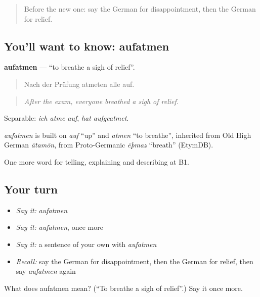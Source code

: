 \begin{quote}
Before the new one: say the German for disappointment, then the German for relief.
\end{quote}

\subsection*{You'll want to know: aufatmen}
\textbf{aufatmen} — \textquotedblleft{}to breathe a sigh of relief\textquotedblright{}.

\begin{quote}
Nach der Prüfung atmeten alle auf.
\end{quote}

\begin{quote}
\emph{After the exam, everyone breathed a sigh of relief.}
\end{quote}

Separable: \emph{ich atme auf}, \emph{hat aufgeatmet}.

\begin{cousinweb}
\emph{aufatmen} is built on \emph{auf} \textquotedblleft{}up\textquotedblright{} and \emph{atmen} \textquotedblleft{}to breathe\textquotedblright{}, inherited from Old High German \emph{ātamōn}, from Proto-Germanic \emph{ēþmaz} \textquotedblleft{}breath\textquotedblright{} (EtymDB).
\end{cousinweb}

\begin{grammarlens}[title={What you've built}]
One more word for telling, explaining and describing at B1.
\end{grammarlens}

\subsection*{Your turn}
\begin{itemize}
\raggedright
  \item \emph{Say it:} \emph{aufatmen}
  \item \emph{Say it:} \emph{aufatmen}, once more
  \item \emph{Say it:} a sentence of your own with \emph{aufatmen}
  \item \emph{Recall:} say the German for disappointment, then the German for relief, then say \emph{aufatmen} again
\end{itemize}

\begin{tcolorbox}[breakable,colback=teal!4,colframe=teal!35!black,title={Before you move on}]
What does aufatmen mean? (\textquotedblleft{}To breathe a sigh of relief\textquotedblright{}.) Say it once more.
\end{tcolorbox}
